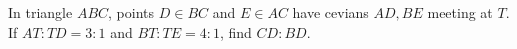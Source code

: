 In triangle $ ABC $, points $ D\in BC $ and $ E\in AC $ have cevians $ AD,BE $ meeting at $ T $. If $ AT:TD=3:1 $ and $ BT:TE=4:1 $, find $ CD:BD $.

